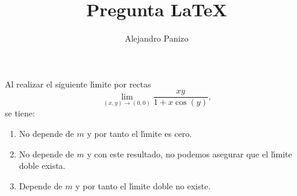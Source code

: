 \documentclass[10pt,spanish,hyperref={pdfpagelabels=false}]{beamer}
\author{Alejandro Panizo}
\title{Pregunta \LaTeX}
\begin{document}
\Large

\rightskip=0pt

\begin{frame}

Al realizar el siguiente l\'{\i}mite por rectas
$$ \lim _{(x,y)\to (0,0)} \dfrac{ xy}{1+x\cos (y)},$$
 se tiene:

\begin{enumerate}[1.] \rightskip=0pt
\item No depende de $m$ y por tanto el l\'{\i}mite es cero.
\item No depende de $m$ y con este resultado, no podemos asegurar  que el l\'{\i}mite doble exista.
\item Depende de $m$ y por tanto  el l\'{\i}mite doble no existe.
\end{enumerate}

\end{frame}
\end{document}
